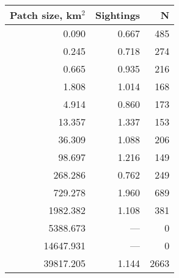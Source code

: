 \begin{tabular}{rrr}
\toprule
 Patch size, km$^2$ &  Sightings &    N \\
\midrule
              0.090 &      0.667 &  485 \\
              0.245 &      0.718 &  274 \\
              0.665 &      0.935 &  216 \\
              1.808 &      1.014 &  168 \\
              4.914 &      0.860 &  173 \\
             13.357 &      1.337 &  153 \\
             36.309 &      1.088 &  206 \\
             98.697 &      1.216 &  149 \\
            268.286 &      0.762 &  249 \\
            729.278 &      1.960 &  689 \\
           1982.382 &      1.108 &  381 \\
           5388.673 &        --- &    0 \\
          14647.931 &        --- &    0 \\
          39817.205 &      1.144 & 2663 \\
\bottomrule
\end{tabular}
